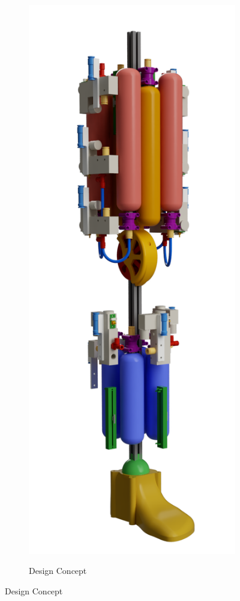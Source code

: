 \documentclass[11pt,a4paper]{article}
\begin{document}
\begin{figure}[hbt!]
\begin{subfigure}[t]{0.4 \textwidth}
        \label{fig:platform_side}
    \end{subfigure}
    \begin{subfigure}[t]{0.4 \textwidth}
        \centering
        \caption{Design Concept}
        \includegraphics[scale=0.2]{Leg_Render.PNG}
        \label{fig:platform_angle}
    \end{subfigure}
    

\end{figure}
\end{document}

